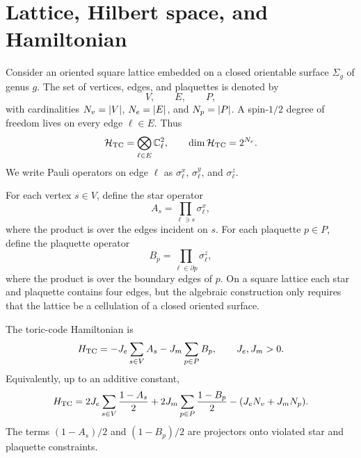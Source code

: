 \section{Lattice, Hilbert space, and Hamiltonian}
\label{sec:toric-code-hamiltonian}

Consider an oriented square lattice embedded on a closed orientable surface
\(\Sigma_g\) of genus \(g\).  The set of vertices, edges, and plaquettes is
denoted by
\begin{equation}
\label{eq:cellulation-sets}
    V,
    \qquad
    E,
    \qquad
    P,
\end{equation}
with cardinalities \(N_v=\left|V\right|\), \(N_e=\left|E\right|\), and \(N_p=\left|P\right|\).
A spin-\(1/2\) degree of freedom lives on every edge \(\ell\in E\).  Thus
\begin{equation}
\label{eq:toric-code-hilbert-space}
    \mathcal{H}_{\rm TC}
    =\bigotimes_{\ell\in E}\mathbb{C}^2_{\ell},
    \qquad
    \dim\mathcal{H}_{\rm TC}=2^{N_e} .
\end{equation}
We write Pauli operators on edge \(\ell\) as \(\sigma^x_{\ell}\),
\(\sigma^y_{\ell}\), and \(\sigma^z_{\ell}\).

For each vertex \(s\in V\), define the star operator
\begin{equation}
\label{eq:toric-code-star-operator}
    A_s=
    \prod_{\ell\ni s}\sigma^x_{\ell},
\end{equation}
where the product is over the edges incident on \(s\).  For each plaquette
\(p\in P\), define the plaquette operator
\begin{equation}
\label{eq:toric-code-plaquette-operator}
    B_p=
    \prod_{\ell\in\partial p}\sigma^z_{\ell},
\end{equation}
where the product is over the boundary edges of \(p\).  On a square lattice each
star and plaquette contains four edges, but the algebraic construction only
requires that the lattice be a cellulation of a closed oriented surface.

The toric-code Hamiltonian is
\begin{equation}
\label{eq:toric-code-hamiltonian}
    H_{\rm TC}
    =
    -J_e\sum_{s\in V}A_s
    -J_m\sum_{p\in P}B_p,
    \qquad
    J_e,J_m>0 .
\end{equation}
Equivalently, up to an additive constant,
\begin{equation}
\label{eq:toric-code-projector-form}
    H_{\rm TC}
    =
    2J_e\sum_{s\in V}\frac{1-A_s}{2}
    +2J_m\sum_{p\in P}\frac{1-B_p}{2}
    -(J_eN_v+J_mN_p).
\end{equation}
The terms \((1-A_s)/2\) and \((1-B_p)/2\) are projectors onto violated star and
plaquette constraints.

